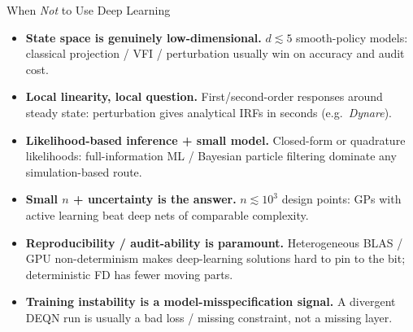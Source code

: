 \documentclass[aspectratio=169,11pt]{beamer}
\begin{document}
\begin{frame}{When \emph{Not} to Use Deep Learning}
\small
\begin{itemize}
    \item \textbf{State space is genuinely low-dimensional.}  $d\lesssim 5$ smooth-policy models: classical projection / VFI / perturbation usually win on accuracy and audit cost.
    \item \textbf{Local linearity, local question.}  First/second-order responses around steady state: perturbation gives analytical IRFs in seconds (e.g.\ \emph{Dynare}).
    \item \textbf{Likelihood-based inference + small model.}  Closed-form or quadrature likelihoods: full-information ML / Bayesian particle filtering dominate any simulation-based route.
    \item \textbf{Small $n$ + uncertainty is the answer.}  $n\lesssim 10^3$ design points: GPs with active learning beat deep nets of comparable complexity.
    \item \textbf{Reproducibility / audit-ability is paramount.}  Heterogeneous BLAS / GPU non-determinism makes deep-learning solutions hard to pin to the bit; deterministic FD has fewer moving parts.
    \item \textbf{Training instability is a model-misspecification signal.}  A divergent DEQN run is usually a bad loss / missing constraint, not a missing layer.
\end{itemize}
\end{frame}
\end{document}
